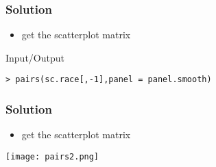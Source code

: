\begin{frame}[fragile]\frametitle{Solution}
  \begin{itemize}
  \item get the scatterplot matrix
  \end{itemize}
  \begin{exampleblock}{Input/Output}\small
\begin{verbatim}
> pairs(sc.race[,-1],panel = panel.smooth)
\end{verbatim}
  \end{exampleblock}
\end{frame}

\begin{frame}[fragile]\frametitle{Solution}
  \begin{itemize}
  \item get the scatterplot matrix
  \end{itemize}
\begin{center}
\texttt{[image: pairs2.png]}
\end{center}
\end{frame}


